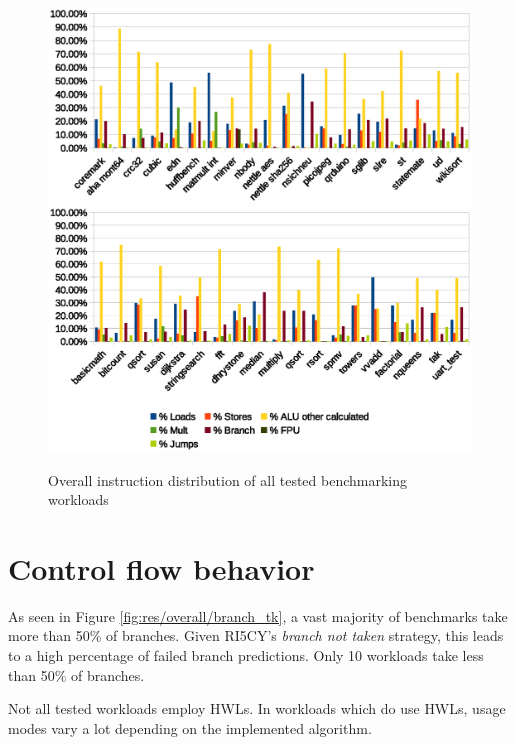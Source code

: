 \documentclass[../bachelor_paper.tex]{subfiles}
\begin{document}
\begin{figure}
    \centering
    \includegraphics[width=\textwidth]{img/graph/overall_inst_dist}
    \includegraphics[width=\textwidth]{img/graph/overall_inst_dist2}
    \caption{Overall instruction distribution of all tested benchmarking workloads}
    \label{fig:res/overall/inst}
\end{figure}

\section{Control flow behavior}
    \label{sec:res/control}
As seen in Figure \ref{fig:res/overall/branch_tk}, a vast majority of benchmarks take more than 50\% of branches. Given RI5CY's \emph{branch not taken} strategy, this leads to a high percentage of failed branch predictions. Only 10 workloads take less than 50\% of branches.

Not all tested workloads employ \acp{HWL}. In workloads which do use \acp{HWL}, usage modes vary a lot depending on the implemented algorithm.
\end{document}

